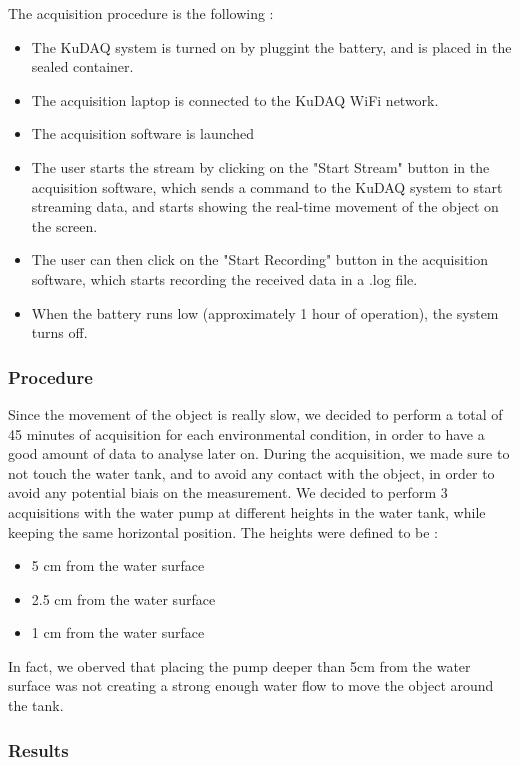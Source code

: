 \documentclass[10pt, a4paper, twocolumn]{article}
\begin{document}
The acquisition procedure is the following :
\begin{itemize}
    \item The KuDAQ system is turned on by pluggint the battery, and is placed in the sealed container.
    \item The acquisition laptop is connected to the KuDAQ WiFi network.
    \item The acquisition software is launched
    \item The user starts the stream by clicking on the "Start Stream" button in the acquisition software, which sends a command to the KuDAQ system to start streaming data, and starts showing the real-time movement of the object on the screen.
    \item The user can then click on the "Start Recording" button in the acquisition software, which starts recording the received data in a .log file.
    \item When the battery runs low (approximately 1 hour of operation), the system turns off.
\end{itemize}

\subsubsection{Procedure}
Since the movement of the object is really slow, we decided to perform a total of 45 minutes of acquisition for each environmental condition, in order to have a good amount of data to analyse later on. During the acquisition, we made sure to not touch the water tank, and to avoid any contact with the object, in order to avoid any potential biais on the measurement.
We decided to perform 3 acquisitions with the water pump at different heights in the water tank, while keeping the same horizontal position. The heights were defined to be :
\begin{itemize}
    \item 5 cm from the water surface
    \item 2.5 cm from the water surface
    \item 1 cm from the water surface
\end{itemize}
In fact, we oberved that placing the pump deeper than 5cm from the water surface was not creating a strong enough water flow to move the object around the tank.

\subsubsection{Results}
\end{document}
